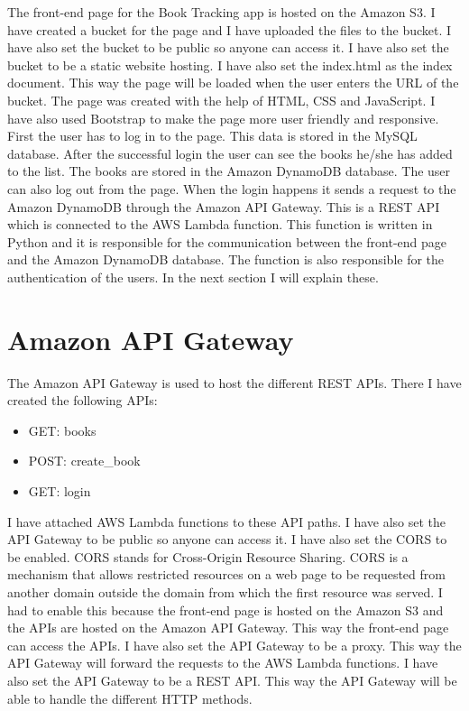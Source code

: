 \documentclass[11pt,a4paper,oneside]{report}
\begin{document}
The front-end page for the Book Tracking app is hosted on the Amazon S3. I have created a bucket for the page and I have uploaded the files to the bucket. I have also set the bucket to be public so anyone can access it. I have also set the bucket to be a static website hosting. I have also set the index.html as the index document. This way the page will be loaded when the user enters the URL of the bucket.
The page was created with the help of HTML, CSS and JavaScript. I have also used Bootstrap to make the page more user friendly and responsive. First the user has to log in to the page.
This data is stored in the MySQL database. After the successful login the user can see the books he/she has added to the list.
The books are stored in the Amazon DynamoDB database. The user can also log out from the page.
When the login happens it sends a request to the Amazon DynamoDB through the Amazon API Gateway.
This is a REST API which is connected to the AWS Lambda function. This function is written in Python and it is responsible for the communication between the front-end page and the Amazon DynamoDB database.
The function is also responsible for the authentication of the users.
In the next section I will explain these.

\section{Amazon API Gateway}

The Amazon API Gateway is used to host the different REST APIs. There I have created the following APIs:
\begin{itemize}
  \item GET: books
  \item POST: create\_book
  \item GET: login
\end{itemize}

I have attached AWS Lambda functions to these API paths. I have also set the API Gateway to be public so anyone can access it.
I have also set the CORS to be enabled. CORS stands for Cross-Origin Resource Sharing. CORS is a mechanism that allows restricted resources on a web page to be requested from another domain outside the domain from which the first resource was served.
I had to enable this because the front-end page is hosted on the Amazon S3 and the APIs are hosted on the Amazon API Gateway.
This way the front-end page can access the APIs. I have also set the API Gateway to be a proxy. This way the API Gateway will forward the requests to the AWS Lambda functions. I have also set the API Gateway to be a REST API. This way the API Gateway will be able to handle the different HTTP methods.
\end{document}
